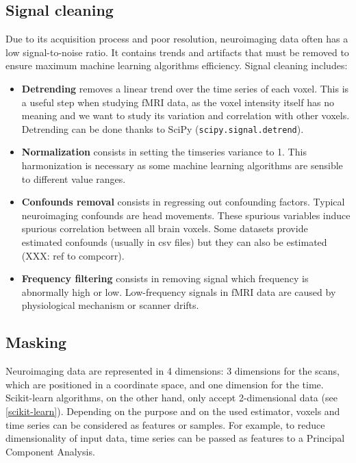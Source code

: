\documentclass{frontiersSCNS} %
\newcounter{x}
\newcounter{y}
\newcounter{z}
\begin{document}
\subsection{Signal cleaning}

Due to its acquisition process and poor resolution, neuroimaging data often has a low
signal-to-noise ratio. It contains trends and artifacts that must be removed
to ensure maximum machine learning algorithms efficiency. Signal cleaning
includes:
\begin{itemize}
    \item{\bf Detrending} removes a linear trend over the time series of each
        voxel. This is a useful step when studying fMRI data, as the voxel
        intensity itself has no meaning and we want to study its variation and
        correlation with other voxels. Detrending can be done thanks to SciPy
        (\texttt{scipy.signal.detrend}).
    \item{\bf Normalization} consists in setting the timseries variance to 1.
        This harmonization is necessary as some machine learning algorithms are
        sensible to different value ranges.
    \item{\bf Confounds removal} consists in regressing out confounding factors.
        Typical neuroimaging confounds are head movements. These spurious
        variables induce spurious correlation between all brain voxels.
        Some datasets provide estimated confounds (usually in csv files) but
        they can also be estimated (XXX: ref to compcorr).
    \item{\bf Frequency filtering} consists in removing signal which frequency is
        abnormally high or low. Low-frequency signals in fMRI data are caused by
        physiological mechanism or scanner drifts.
\end{itemize}

\subsection{Masking}

Neuroimaging data are represented in 4 dimensions: 3 dimensions for the scans,
which are positioned in a coordinate space, and one dimension for the time.
Scikit-learn algorithms, on the other hand, only accept 2-dimensional data (see
\ref{scikit-learn}).
Depending on the purpose and on the used estimator, voxels and time series can be
considered as features
or samples. For example, to reduce dimensionality of input data,
time series can be passed as features to a Principal Component Analysis.
\end{document}
